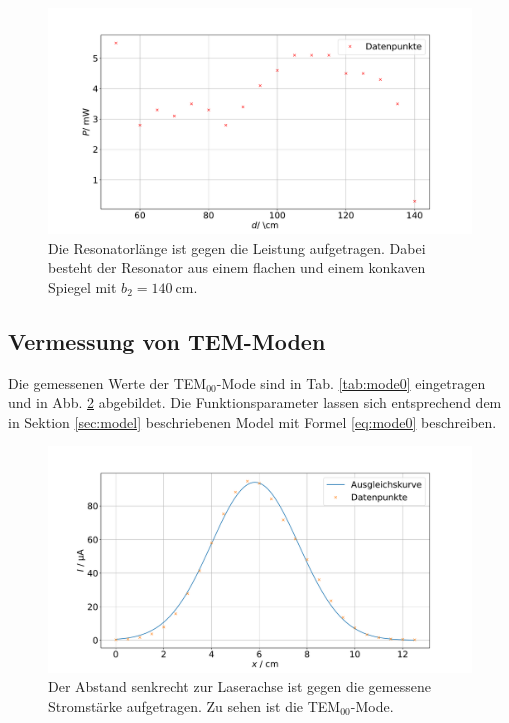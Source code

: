 

\begin{figure}
    \centering
    \includegraphics[width=15cm]{plots/stability_flat.pdf}
    \caption{Die Resonatorlänge ist gegen die Leistung aufgetragen. Dabei besteht der Resonator aus einem flachen und einem konkaven Spiegel mit $b_2 = \SI{140}{\centi\meter}$.}
    \label{fig:stability_flat}
\end{figure} 

\subsection{Vermessung von TEM-Moden}

Die gemessenen Werte der TEM$_{00}$-Mode sind in Tab. \ref{tab:mode0} eingetragen und in Abb. \ref{fig:mode0} abgebildet. 
Die Funktionsparameter lassen sich entsprechend dem in Sektion \ref{sec:model} beschriebenen Model mit Formel \eqref{eq:mode0} beschreiben.


\begin{figure}
    \centering
    \includegraphics[width=\textwidth]{plots/mode0.pdf}
    \caption{Der Abstand senkrecht zur Laserachse ist gegen die gemessene Stromstärke aufgetragen. Zu sehen ist die TEM$_{00}$-Mode.}
    \label{fig:mode0}
\end{figure}

